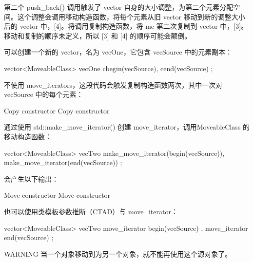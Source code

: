 第二个 push\_back() 调用触发了 vector 自身的大小调整，为第二个元素分配空间。这个调整会调用移动构造函数，将每个元素从旧 vector 移动到新的调整大小后的 vector 中，[4]。将调用复制构造函数，将 mc 第二次复制到 vector 中，[3]。移动和复制的顺序未定义，所以 [3] 和 [4] 的顺序可能会颠倒。

可以创建一个新的 vector，名为 vecOne，它包含 vecSource 中的元素副本：

\begin{cpp}
vector<MoveableClass> vecOne { cbegin(vecSource), cend(vecSource) };
\end{cpp}

不使用 move\_iterators，这段代码会触发复制构造函数两次，其中一次对 vecSource 中的每个元素：

\begin{shell}
Copy constructor
Copy constructor
\end{shell}

通过使用 std::make\_move\_iterator() 创建 move\_iterator，调用MoveableClass 的移动构造函数：

\begin{cpp}
vector<MoveableClass> vecTwo { make_move_iterator(begin(vecSource)),
                               make_move_iterator(end(vecSource)) };
\end{cpp}

会产生以下输出：

\begin{shell}
Move constructor
Move constructor
\end{shell}

也可以使用类模板参数推断（CTAD）与 move\_iterator：

\begin{cpp}
vector<MoveableClass> vecTwo { move_iterator { begin(vecSource) },
                               move_iterator { end(vecSource) } };
\end{cpp}

\begin{myWarning}{WARNING}
当一个对象移动到为另一个对象，就不能再使用这个源对象了。
\end{myWarning}














